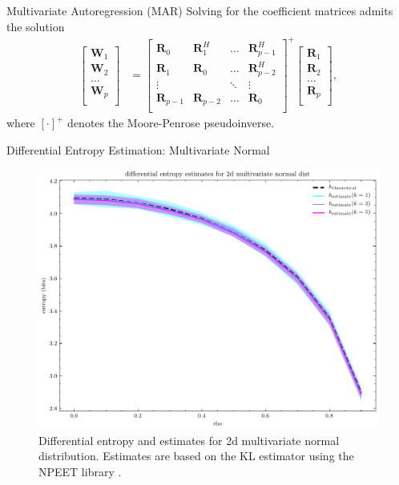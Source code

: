 \documentclass{beamer}
\begin{document}
  \begin{frame}{Multivariate Autoregression (MAR)}
    Solving for the coefficient matrices admits the solution
    \begin{align}
      \begin{bmatrix}
        \mathbf W_{1} \\ \mathbf W_{2} \\ \dots \\ \mathbf W_{p} \\
      \end{bmatrix}
      &= 
      \begin{bmatrix}
        \mathbf R_{0} & \mathbf R_1^H & \dots  & \mathbf R_{p-1}^H \\
        \mathbf R_{1} & \mathbf R_0   & \dots  & \mathbf R_{p-2}^H \\
        \vdots      &         & \ddots & \vdots \\
        \mathbf R_{p-1} & \mathbf R_{p-2}   & \dots  & \mathbf R_{0} \\
      \end{bmatrix}^{+}
      \begin{bmatrix}
        \mathbf R_{1} \\ \mathbf R_{2} \\ \dots \\ \mathbf R_{p} \\
      \end{bmatrix}, \label{eq:mar-solution}
    \end{align}
    where $[\cdot]^+$ denotes the Moore-Penrose pseudoinverse.
  \end{frame}

  \begin{frame}{Differential Entropy Estimation: Multivariate Normal}
    \begin{figure}[htb] \centering 
      \includegraphics[width=0.7\linewidth]{multivar_normal.pdf}
      \caption{Differential entropy and estimates for 2d multivariate normal distribution. Estimates are based on the KL estimator \cite{ref:Kozachenko1987SampleEstimate} using the NPEET library \cite{ref:VerSteeg2019NPEET}.} 
      \label{fig:multivar-normal-valid} 
    \end{figure}
  \end{frame}
\end{document}
